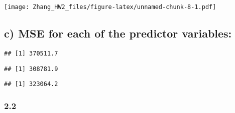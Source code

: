 \documentclass[]{article}
\newenvironment{Shaded}{\begin{snugshade}}{\end{snugshade}}
\newcommand{\DecValTok}[1]{\textcolor[rgb]{0.00,0.00,0.81}{#1}}
\newcommand{\FloatTok}[1]{\textcolor[rgb]{0.00,0.00,0.81}{#1}}
\newcommand{\KeywordTok}[1]{\textcolor[rgb]{0.13,0.29,0.53}{\textbf{#1}}}
\newcommand{\NormalTok}[1]{#1}
\newcommand{\OperatorTok}[1]{\textcolor[rgb]{0.81,0.36,0.00}{\textbf{#1}}}
\newcommand{\StringTok}[1]{\textcolor[rgb]{0.31,0.60,0.02}{#1}}
\begin{document}
\texttt{[image: Zhang\_HW2\_files/figure-latex/unnamed-chunk-8-1.pdf]}

\hypertarget{c-mse-for-each-of-the-predictor-variables}{%
\subsection{c) MSE for each of the predictor
variables:}\label{c-mse-for-each-of-the-predictor-variables}}

\begin{Shaded}
\end{Shaded}

\begin{verbatim}
## [1] 370511.7
\end{verbatim}

\begin{Shaded}
\end{Shaded}

\begin{verbatim}
## [1] 308781.9
\end{verbatim}

\begin{Shaded}
\end{Shaded}

\begin{verbatim}
## [1] 323064.2
\end{verbatim}

\hypertarget{section-1}{%
\subsubsection{2.2}\label{section-1}}
\end{document}
